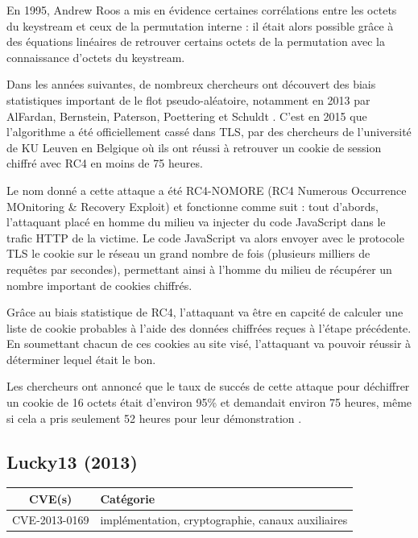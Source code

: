 En 1995, Andrew Roos a mis en évidence certaines corrélations entre les octets du keystream et ceux de la permutation interne : il était alors possible grâce à des équations linéaires de retrouver certains octets de la permutation avec la connaissance d'octets du keystream.

Dans les années suivantes, de nombreux chercheurs ont découvert des biais statistiques important de le flot pseudo-aléatoire, notamment en 2013 par AlFardan, Bernstein, Paterson, Poettering et Schuldt \cite{rc4}. C'est en 2015 que l'algorithme a été officiellement cassé dans TLS, par des chercheurs de l'université de KU Leuven en Belgique où ils ont réussi à retrouver un cookie de session chiffré avec RC4 en moins de 75 heures.

Le nom donné a cette attaque a été RC4-NOMORE (RC4 Numerous Occurrence MOnitoring \& Recovery Exploit) et fonctionne comme suit : tout d'abords, l'attaquant placé en homme du milieu va injecter du code JavaScript dans le trafic HTTP de la victime. Le code JavaScript va alors envoyer avec le protocole TLS le cookie sur le réseau un grand nombre de fois (plusieurs milliers de requêtes par secondes), permettant ainsi à l'homme du milieu de récupérer un nombre important de cookies chiffrés.

Grâce au biais statistique de RC4, l'attaquant va être en capcité de calculer une liste de cookie probables à l'aide des données chiffrées reçues à l'étape précédente. En soumettant chacun de ces cookies au site visé, l'attaquant va pouvoir réussir à déterminer lequel était le bon.

Les chercheurs ont annoncé que le taux de succés de cette attaque pour déchiffrer un cookie de 16 octets était d'environ 95\% et demandait environ 75 heures, même si cela a pris seulement 52 heures pour leur démonstration \cite{rc4nomore}.




\subsection{Lucky13 (2013)}

\begin{tabularx}{0.96\textwidth}{|c|X|}
  \hline
  \textbf{CVE(s)} & \textbf{Catégorie} \\
  \hline
  CVE-2013-0169 & implémentation, cryptographie, canaux auxiliaires \\
  \hline
\end{tabularx}

